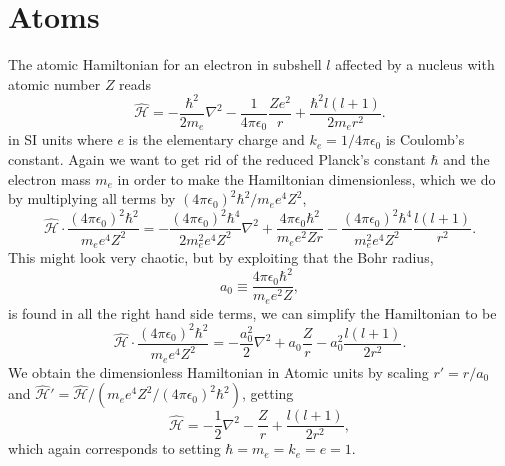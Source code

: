 \section{Atoms}
The atomic Hamiltonian for an electron in subshell $l$ affected by a nucleus with atomic number $Z$ reads
\begin{equation}
\hat{\mathcal{H}}=-\frac{\hbar^2}{2m_e}\nabla^2-\frac{1}{4\pi\epsilon_0}\frac{Ze^2}{r}+\frac{\hbar^2l(l+1)}{2m_er^2}.
\label{eq:HamiltonianAtomic}
\end{equation}
in SI units where $e$ is the elementary charge and $k_e=1/4\pi\epsilon_0$ is Coulomb's constant. Again we want to get rid of the reduced Planck's constant $\hbar$ and the electron mass $m_e$ in order to make the Hamiltonian dimensionless, which we do by multiplying all terms by $(4\pi\epsilon_0)^2\hbar^2/m_ee^4Z^2$,
\begin{equation}
\hat{\mathcal{H}}\cdot\frac{(4\pi\epsilon_0)^2\hbar^2}{m_ee^4Z^2}=-\frac{(4\pi\epsilon_0)^2\hbar^4}{2m_e^2e^4Z^2}\nabla^2+\frac{4\pi\epsilon_0\hbar^2}{m_ee^2Zr}-\frac{(4\pi\epsilon_0)^2\hbar^4}{m_e^2e^4Z^2}\frac{l(l+1)}{r^2}.
\end{equation}
This might look very chaotic, but by exploiting that the Bohr radius,
\begin{equation}
a_0\equiv\frac{4\pi\epsilon_0\hbar^2}{m_ee^2Z},
\end{equation}
is found in all the right hand side terms, we can simplify the Hamiltonian to be
\begin{equation}
\hat{\mathcal{H}}\cdot\frac{(4\pi\epsilon_0)^2\hbar^2}{m_ee^4Z^2}=-\frac{a_0^2}{2}\nabla^2+a_0\frac{Z}{r}-a_0^2\frac{l(l+1)}{2r^2}.
\end{equation}
We obtain the dimensionless Hamiltonian in Atomic units by scaling  $r'=r/a_0$ and $\hat{\mathcal{H}}'=\hat{\mathcal{H}}/(m_ee^4Z^2/(4\pi\epsilon_0)^2\hbar^2)$, getting
\begin{equation}
\hat{\mathcal{H}}=-\frac{1}{2}\nabla^2-\frac{Z}{r}+\frac{l(l+1)}{2r^2},
\end{equation}
which again corresponds to setting $\hbar=m_e=k_e=e=1$.

